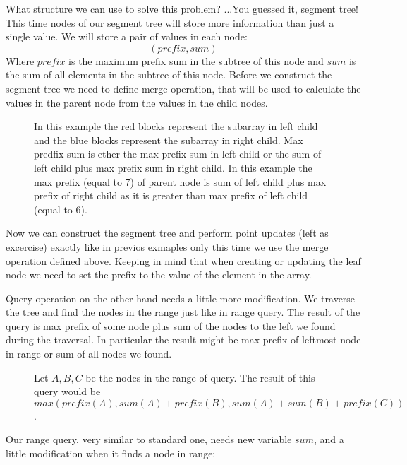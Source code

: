 \documentclass{article}
\begin{document}
What structure we can use to solve this problem? ...You guessed it, segment tree! 
This time nodes of our segment tree will store more information than just a single value. 
We will store a pair of values in each node:
\begin{equation}
    (prefix, sum)
\end{equation}
Where \(prefix\) is the maximum prefix sum in the subtree of this node and \(sum\) is the sum of all elements in the subtree of this node. Before we construct the segment tree we need to define merge operation, that will be used to calculate the values in the parent node from the values in the child nodes.


\begin{figure}[H]
    \centering
    
    \caption{In this example the red blocks represent the subarray in left child and the blue blocks represent the subarray in right child. 
    Max predfix sum is ether the max prefix sum in left child or the sum of left child plus max prefix sum in right child. In this example the max prefix (equal to 7) of parent node is sum of left child plus max prefix of right child as it is greater than max prefix of left child (equal to 6).}
\end{figure}

Now we can construct the segment tree and perform point updates (left as excercise) exactly like in previos exmaples only this time we use the merge operation defined above.
Keeping in mind that when creating or updating the leaf node we need to set the prefix to the value of the element in the array.

Query operation on the other hand needs a little more modification.
We traverse the tree and find the nodes in the range just like in range query.
The result of the query is max prefix of some node plus sum of the nodes to the left we found during the traversal.
In particular the result might be max prefix of leftmost node in range or sum of all nodes we found.
\begin{figure}[H]
    \centering
    
    \caption{Let $A,B,C$ be the nodes in the range of query. The result of this query would be $max(prefix(A), sum(A) + prefix(B), sum(A) + sum(B) + prefix(C))$.}
\end{figure}

Our range query, very similar to standard one, needs new variable $sum$, and a little modification 
when it finds a node in range:


\end{document}
